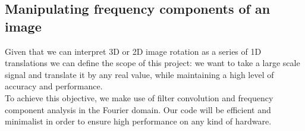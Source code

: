 \documentclass[]{usiinfbachelorproject}
\begin{document}
	
	\subsection{Manipulating frequency components of an image}
	Given that we can interpret 3D or 2D image rotation as a series of 1D translations we can define the scope of this project: we want to take a large scale signal and translate it by any real value, while maintaining a high level of accuracy and performance.\\
	To achieve this objective, we make use of filter convolution and frequency component analysis in the Fourier domain.
	Our code will be efficient and minimalist in order to ensure high performance on any kind of hardware. 
	

	
	
	
	
\end{document}
